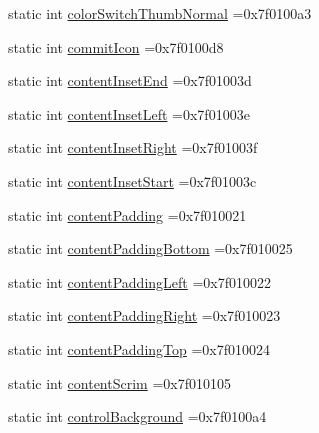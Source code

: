 \begin{DoxyCompactItemize}
\item 
static int \hyperlink{classandroid_1_1support_1_1graphics_1_1drawable_1_1R_1_1attr_a05d6a17a9429df80cf772e49268c3f59}{color\+Switch\+Thumb\+Normal} =0x7f0100a3
\item 
static int \hyperlink{classandroid_1_1support_1_1graphics_1_1drawable_1_1R_1_1attr_adb18e403a58f955940b9755ca0734e37}{commit\+Icon} =0x7f0100d8
\item 
static int \hyperlink{classandroid_1_1support_1_1graphics_1_1drawable_1_1R_1_1attr_a598f9ee46c4d9182528f2ce45bbc6b5a}{content\+Inset\+End} =0x7f01003d
\item 
static int \hyperlink{classandroid_1_1support_1_1graphics_1_1drawable_1_1R_1_1attr_ab973b752450f14f784c54d2ade692447}{content\+Inset\+Left} =0x7f01003e
\item 
static int \hyperlink{classandroid_1_1support_1_1graphics_1_1drawable_1_1R_1_1attr_a9ebd76210a2797f0e62964d23cb3bf77}{content\+Inset\+Right} =0x7f01003f
\item 
static int \hyperlink{classandroid_1_1support_1_1graphics_1_1drawable_1_1R_1_1attr_aadd84bdaef566218b8f062338555e3d7}{content\+Inset\+Start} =0x7f01003c
\item 
static int \hyperlink{classandroid_1_1support_1_1graphics_1_1drawable_1_1R_1_1attr_ad0cb8399a412ab962ec7ed754d7e6dc7}{content\+Padding} =0x7f010021
\item 
static int \hyperlink{classandroid_1_1support_1_1graphics_1_1drawable_1_1R_1_1attr_ac4f86ab3e5d1661a607c22af1609d03f}{content\+Padding\+Bottom} =0x7f010025
\item 
static int \hyperlink{classandroid_1_1support_1_1graphics_1_1drawable_1_1R_1_1attr_a54922645e3e1b2cd7ed30601f82d4f48}{content\+Padding\+Left} =0x7f010022
\item 
static int \hyperlink{classandroid_1_1support_1_1graphics_1_1drawable_1_1R_1_1attr_aa00be535521f7ba8f941a6bdd563eff7}{content\+Padding\+Right} =0x7f010023
\item 
static int \hyperlink{classandroid_1_1support_1_1graphics_1_1drawable_1_1R_1_1attr_a4f6565167b2206aecfb2f26f04d89ce1}{content\+Padding\+Top} =0x7f010024
\item 
static int \hyperlink{classandroid_1_1support_1_1graphics_1_1drawable_1_1R_1_1attr_a69a33d1e5464300fde6db42994636dec}{content\+Scrim} =0x7f010105
\item 
static int \hyperlink{classandroid_1_1support_1_1graphics_1_1drawable_1_1R_1_1attr_aac5d5a0aff0c33aa3399c429eaaac6a0}{control\+Background} =0x7f0100a4
\item 

\end{DoxyCompactItemize}

